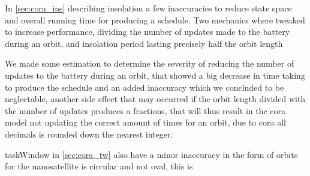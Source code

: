 In \cref{sec:cora_ins} describing insolation a few inaccuracies to reduce state space and overall running time for producing a schedule. Two mechanics where tweaked to increase performance, dividing the number of updates made to the battery during an orbit, and insolation period lasting precisely half the orbit length 

We made some estimation to determine the severity of reducing the number of updates to the battery during an orbit, that showed a big decrease in time taking to produce the schedule and an added inaccuracy which we concluded to be neglectable, another side effect that may occurred  if the orbit length divided with the number of updates produces a fractions, that will thus result in the \gls{cora} model not updating the correct amount of times for an orbit, due to \gls{cora} all decimals is rounded down the nearest integer.

taskWindow in \cref{sec:cora_tw} also have a minor inaccuracy in the form of orbits for the nanosatellite is circular and not oval, this is 








